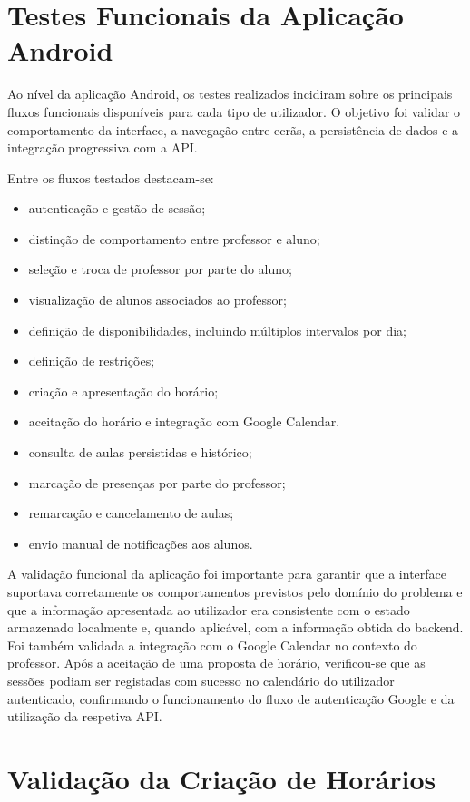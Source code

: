 \section{Testes Funcionais da Aplicação Android}

Ao nível da aplicação Android, os testes realizados incidiram sobre os principais fluxos funcionais disponíveis para cada tipo de utilizador.
O objetivo foi validar o comportamento da interface, a navegação entre ecrãs, a persistência de dados e a integração progressiva com a API.

Entre os fluxos testados destacam-se:
\begin{itemize}
    \item autenticação e gestão de sessão;
    \item distinção de comportamento entre professor e aluno;
    \item seleção e troca de professor por parte do aluno;
    \item visualização de alunos associados ao professor;
    \item definição de disponibilidades, incluindo múltiplos intervalos por dia;
    \item definição de restrições;
    \item criação e apresentação do horário;
    \item aceitação do horário e integração com Google Calendar.
    \item consulta de aulas persistidas e histórico;
    \item marcação de presenças por parte do professor;
    \item remarcação e cancelamento de aulas;
    \item envio manual de notificações aos alunos.
\end{itemize}

A validação funcional da aplicação foi importante para garantir que a interface suportava corretamente os comportamentos previstos pelo domínio
do problema e que a informação apresentada ao utilizador era consistente com o estado armazenado localmente e, quando aplicável, com a informação obtida do backend.
Foi também validada a integração com o Google Calendar no contexto do professor.
Após a aceitação de uma proposta de horário, verificou-se que as sessões podiam ser registadas com sucesso no calendário do utilizador autenticado, confirmando o funcionamento do fluxo de autenticação Google e da utilização da respetiva API.

\section{Validação da Criação de Horários}

